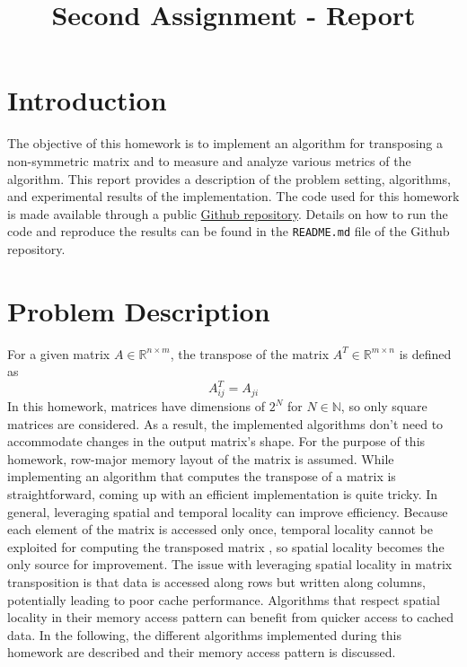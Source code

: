 \documentclass[conference]{IEEEtran}
\begin{document}
    \title{Second Assignment - Report}
    \author{
    }
    \maketitle

    \setcounter{page}{1}

    \section{Introduction}    
    The objective of this homework is to implement an algorithm for transposing a non-symmetric matrix and to measure and analyze various metrics of the algorithm. This report provides a description of the problem setting, algorithms, and experimental results of the implementation.
    The code used for this homework is made available through a public \href{https://github.com/chrisdalvit/gpu-matrix-transpose-benchmark}{Github repository}. Details on how to run the code and reproduce the results can be found in the \texttt{README.md} file of the Github repository.

    \section{Problem Description}
    For a given matrix $A \in \mathbb{R}^{n \times m}$, the transpose of the matrix $A^T \in \mathbb{R}^{m \times n}$ is defined as
    $$
        A^T_{ij} = A_{ji}
    $$
    In this homework, matrices have dimensions of $2^N$ for $N \in \mathbb{N}$, so only square matrices are considered. As a result, the implemented algorithms don't need to accommodate changes in the output matrix's shape. For the purpose of this homework, row-major memory layout of the matrix is assumed.
    While implementing an algorithm that computes the transpose of a matrix is straightforward, coming up with an efficient implementation is quite tricky. In general, leveraging spatial and temporal locality can improve efficiency. Because each element of the matrix is accessed only once, temporal locality cannot be exploited for computing the transposed matrix \cite{chatterjee2000cache}, so spatial locality becomes the only source for improvement. The issue with leveraging spatial locality in matrix transposition is that data is accessed along rows but written along columns, potentially leading to poor cache performance. Algorithms that respect spatial locality in their memory access pattern can benefit from quicker access to cached data. In the following, the different algorithms implemented during this homework are described and their memory access pattern is discussed.
\end{document}
